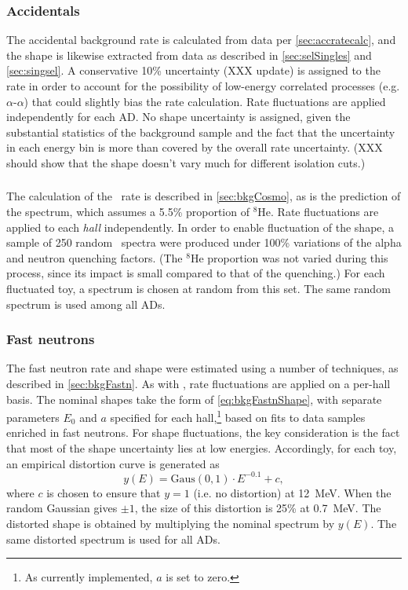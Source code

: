 \documentclass[../thesis.tex]{subfiles}
\begin{document}
\subsubsection{Accidentals}

The accidental background rate is calculated from data per \autoref{sec:accratecalc}, and the shape is likewise extracted from data as described in \autoref{sec:selSingles} and \autoref{sec:singsel}. A conservative 10\% uncertainty (XXX update) is assigned to the rate in order to account for the possibility of low-energy correlated processes (e.g. $\alpha$-$\alpha$) that could slightly bias the rate calculation. Rate fluctuations are applied independently for each AD. No shape uncertainty is assigned, given the substantial statistics of the background sample and the fact that the uncertainty in each energy bin is more than covered by the overall rate uncertainty. (XXX should show that the shape doesn't vary much for different isolation cuts.)

\subsubsection{\LiHe}

The calculation of the \LiHe\ rate is described in \autoref{sec:bkgCosmo}, as is the prediction of the spectrum, which assumes a 5.5\% proportion of $^8$He. Rate fluctuations are applied to each \emph{hall} independently. In order to enable fluctuation of the shape, a sample of 250 random \LiHe\ spectra were produced under 100\% variations of the alpha and neutron quenching factors. (The $^8$He proportion was not varied during this process, since its impact is small compared to that of the quenching.) For each fluctuated toy, a spectrum is chosen at random from this set. The same random spectrum is used among all ADs.

\subsubsection{Fast neutrons}

The fast neutron rate and shape were estimated using a number of techniques, as described in \autoref{sec:bkgFastn}. As with \LiHe, rate fluctuations are applied on a per-hall basis. The nominal shapes take the form of \autoref{eq:bkgFastnShape}, with separate parameters $E_0$ and $a$ specified for each hall,\footnote{As currently implemented, $a$ is set to zero.} based on fits to data samples enriched in fast neutrons. For shape fluctuations, the key consideration is the fact that most of the shape uncertainty lies at low energies. Accordingly, for each toy, an empirical distortion curve is generated as
\begin{equation*}
  y(E) = \mathrm{Gaus}(0,1) \cdot E^{-0.1} + c,
\end{equation*}
where $c$ is chosen to ensure that $y = 1$ (i.e. no distortion) at 12~MeV. When the random Gaussian gives $\pm 1$, the size of this distortion is 25\% at 0.7~MeV. The distorted shape is obtained by multiplying the nominal spectrum by $y(E)$. The same distorted spectrum is used for all ADs.
\end{document}
